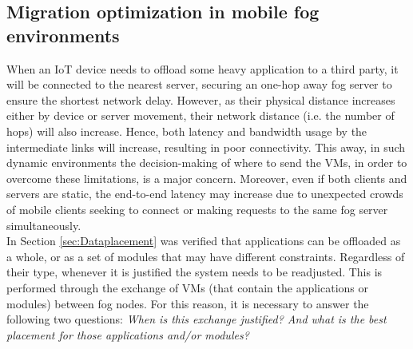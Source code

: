 \vfill\pagebreak
\subsection{Migration optimization in mobile fog environments}
\label{sec:Migration}
When an IoT device needs to offload some heavy application to a third party, it will be connected to the nearest server, securing an one-hop away fog server to ensure the shortest network delay. However, as their physical distance increases either by device or server movement, their network distance (i.e. the number of hops) will also increase. Hence, both latency and bandwidth usage by the intermediate links will increase, resulting in poor connectivity. This away, in such dynamic environments the decision-making of where to send the VMs, in order to overcome these limitations, is a major concern. Moreover, even if both clients and servers are static, the end-to-end latency may increase due to unexpected crowds of mobile clients seeking to connect or making requests to the same fog server simultaneously.\\
\noindent\tab In Section \ref{sec:Dataplacement} was verified that applications can be offloaded as a whole, or as a set of modules that may have different constraints. Regardless of their type, whenever it is justified the system needs to be readjusted. This is performed through the exchange of VMs (that contain the applications or modules) between fog nodes. For this reason, it is necessary to answer the following two questions: \textit{When is this exchange justified? And what is the best placement for those applications and/or modules?}\\


